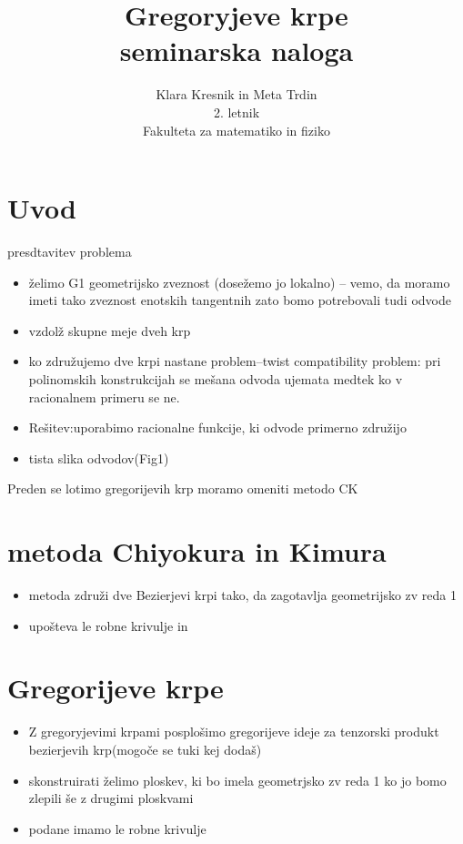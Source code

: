 \documentclass[a4paper,12pt]{article}
\title{Gregoryjeve krpe\\
\Large seminarska naloga}
\date{}
\author{Klara Kresnik in Meta Trdin\\
2. letnik\\
Fakulteta za matematiko in fiziko\\
}
\begin{document}
\maketitle
\pagebreak



\section{Uvod}
presdtavitev problema

\begin{itemize}
	\item želimo G1 geometrijsko zveznost (dosežemo jo lokalno) -- vemo, da moramo imeti tako zveznost enotskih tangentnih zato bomo potrebovali tudi odvode
	\item vzdolž skupne meje dveh krp 
	\item ko združujemo dve krpi nastane problem--twist compatibility problem: pri polinomskih konstrukcijah se mešana odvoda ujemata medtek ko v racionalnem primeru se ne.
	\item Rešitev:uporabimo racionalne funkcije, ki odvode primerno združijo
	\item tista slika odvodov(Fig1)
	
	
\end{itemize}

Preden se lotimo gregorijevih krp moramo omeniti metodo CK


\section{metoda Chiyokura in Kimura}
\begin{itemize}
	\item metoda združi dve Bezierjevi krpi tako, da zagotavlja geometrijsko zv reda 1
	\item upošteva le robne krivulje in	
\end{itemize}
 


\section{Gregorijeve krpe}
\begin{itemize}
	\item Z gregoryjevimi krpami posplošimo gregorijeve ideje za tenzorski produkt bezierjevih krp(mogoče se tuki kej dodaš)
	\item skonstruirati želimo ploskev, ki bo imela geometrjsko zv reda 1 ko jo bomo zlepili še z drugimi ploskvami
	\item podane imamo le robne krivulje
\end{itemize}
\end{document}
